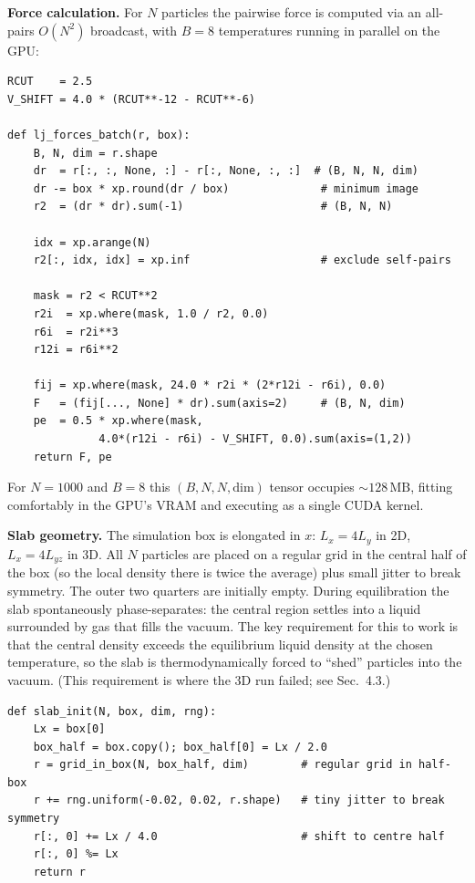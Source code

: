 \documentclass[12pt,a4paper]{article}
\begin{document}
\textbf{Force calculation.} For $N$ particles the pairwise force is computed via an
all-pairs $O(N^2)$ broadcast, with $B = 8$ temperatures running in parallel on the GPU:

\begin{lstlisting}[caption={Batched all-pairs LJ force kernel (\texttt{md\_lj.py}).
Input \texttt{r} has shape \texttt{(B, N, dim)}.}]
RCUT    = 2.5
V_SHIFT = 4.0 * (RCUT**-12 - RCUT**-6)

def lj_forces_batch(r, box):
    B, N, dim = r.shape
    dr  = r[:, :, None, :] - r[:, None, :, :]  # (B, N, N, dim)
    dr -= box * xp.round(dr / box)              # minimum image
    r2  = (dr * dr).sum(-1)                     # (B, N, N)

    idx = xp.arange(N)
    r2[:, idx, idx] = xp.inf                    # exclude self-pairs

    mask = r2 < RCUT**2
    r2i  = xp.where(mask, 1.0 / r2, 0.0)
    r6i  = r2i**3
    r12i = r6i**2

    fij = xp.where(mask, 24.0 * r2i * (2*r12i - r6i), 0.0)
    F   = (fij[..., None] * dr).sum(axis=2)     # (B, N, dim)
    pe  = 0.5 * xp.where(mask,
              4.0*(r12i - r6i) - V_SHIFT, 0.0).sum(axis=(1,2))
    return F, pe
\end{lstlisting}

For $N = 1000$ and $B = 8$ this $(B, N, N, \mathrm{dim})$ tensor occupies
$\sim 128\,\mathrm{MB}$, fitting comfortably in the GPU's VRAM and executing as a single
CUDA kernel.

\textbf{Slab geometry.} The simulation box is elongated in $x$: $L_x = 4 L_y$ in 2D, $L_x
= 4 L_{yz}$ in 3D. All $N$ particles are placed on a regular grid in the central half of
the box (so the local density there is twice the average) plus small jitter to break
symmetry. The outer two quarters are initially empty. During equilibration the slab
spontaneously phase-separates: the central region settles into a liquid surrounded by gas
that fills the vacuum. The key requirement for this to work is that the central density
exceeds the equilibrium liquid density at the chosen temperature, so the slab is
thermodynamically forced to ``shed'' particles into the vacuum. (This requirement is
where the 3D run failed; see Sec.~4.3.)

\begin{lstlisting}[caption={Slab initial condition (\texttt{md\_lj.py}). Particles are
placed on a grid in $x \in [L_x/4,\, 3L_x/4]$.}]
def slab_init(N, box, dim, rng):
    Lx = box[0]
    box_half = box.copy(); box_half[0] = Lx / 2.0
    r = grid_in_box(N, box_half, dim)        # regular grid in half-box
    r += rng.uniform(-0.02, 0.02, r.shape)   # tiny jitter to break symmetry
    r[:, 0] += Lx / 4.0                      # shift to centre half
    r[:, 0] %= Lx
    return r
\end{lstlisting}
\end{document}
